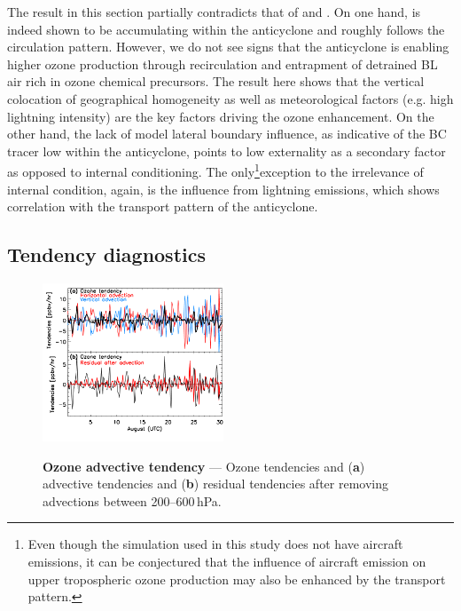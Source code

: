 The result in this section partially contradicts that of \citet{Li:2005ss} and \citet{Cooper:2007cr}. On one hand, {\lnox} is indeed shown to be
accumulating within the anticyclone and roughly follows the circulation pattern. However, we do not see signs that the anticyclone is
enabling higher ozone production through recirculation and entrapment of detrained BL air rich in ozone chemical precursors. The result here
shows that the vertical colocation of geographical homogeneity as well as meteorological factors (e.g. high lightning intensity) are the key factors
driving the ozone enhancement. On the other hand, the lack of model lateral boundary influence, as indicative of the BC tracer low within the
anticyclone, points to low externality as a secondary factor as opposed to internal conditioning. The only\footnote{Even though the simulation used
in this study does not have aircraft emissions, it can be conjectured that the influence of aircraft emission on upper tropospheric ozone production
may also be enhanced by the transport pattern.}exception to
the irrelevance of internal condition, again, is the influence from lightning emissions, which shows correlation with the transport pattern of the anticyclone.

\subsection{Tendency diagnostics}\label{ssec:2006/discuss/tendency}

	\begin{figure}
		\centering
		\begin{singlespacing}
		\vspace{-.2in}
		\label{fig:2006/tend_residual}
		\includegraphics[width=0.48\textwidth]{tendency/residual}
		\caption[Ozone advective tendency]{{\small\textbf{Ozone advective tendency} --- Ozone tendencies and ({\bf a}) advective tendencies
		and ({\bf b}) residual tendencies after removing advections between 200--600\,\unit{hPa}. \vspace{-.2in}}}
		\end{singlespacing}
	\end{figure}

